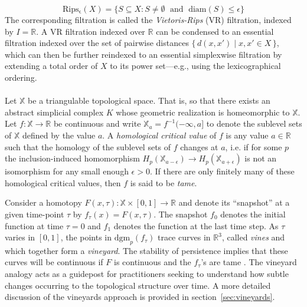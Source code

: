\documentclass{article} %
\begin{document}
\begin{equation}\label{eq:rips}
	\mathrm{Rips_\epsilon}(X) = \{ S \subseteq X : S \neq \emptyset \;\mbox{ and }\;\mathrm{diam}(S) \leq \epsilon \}
\end{equation} 
The corresponding filtration is called the \emph{Vietoris-Rips} (VR) filtration, indexed by $I = \mathbb{R}$. 
A VR filtration indexed over $\mathbb{R}$  can be condensed to an essential filtration indexed over the set of pairwise distances $\{\, d(x,x') \; | \; x,x' \in X \, \}$, 
which can then be further reindexed to an essential simplexwise filtration by extending a total order of $X$ to its power set---e.g., 
using the lexicographical ordering. 
\\
\\
Let $\mathbb{X}$ be a triangulable topological space. 
That is, so that there exists an abstract 
simplicial complex $K$ whose geometric realization  is homeomorphic to 
$\mathbb{X}$. 
Let  $f: \mathbb{X} \to \mathbb{R}$ be continuous and  
write $\mathbb{X}_a = f^{-1}(-\infty, a]$ to denote the sublevel sets of $\mathbb{X}$ defined by the value $a$. 
A \emph{homological critical value} of $f$ is any value $a \in \mathbb{R}$ such that the homology of the sublevel sets of $f$ changes at $a$, i.e.  if for some $p$ the inclusion-induced homomorphism  $H_p(\mathbb{X}_{a - \epsilon}) \to H_p(\mathbb{X}_{a+\epsilon})$ is not an isomorphism for  any small enough $\epsilon >0$. If there are only finitely many of these homological critical values, then $f$ is said to be \emph{tame}. 

Consider a homotopy $F(x,\tau) : \mathbb{X} \times [0,1] \to \mathbb{R}$ and denote its ``snapshot'' at a given time-point $\tau$ by $f_\tau(x) = F(x,\tau)$.
The snapshot $f_0$ denotes the initial function at time $\tau = 0$ and $f_1$ denotes the function at the last time step. 
As $\tau$ varies in $[0,1]$, the points in $\mathrm{dgm}_p(f_\tau)$ trace  curves in $\mathbb{R}^3$, called \emph{vines} and which together form a \emph{vineyard}. 
The stability of persistence implies that these curves will be continuous if $F$ is continuous
and the $f_\tau$'s are tame \cite{cohen2007stability}.
The vineyard analogy acts as a guidepost for practitioners seeking to understand how subtle changes occurring to the topological structure over time.
A more detailed discussion of the vineyards approach is provided in section~\ref{sec:vineyards}.
\end{document}
